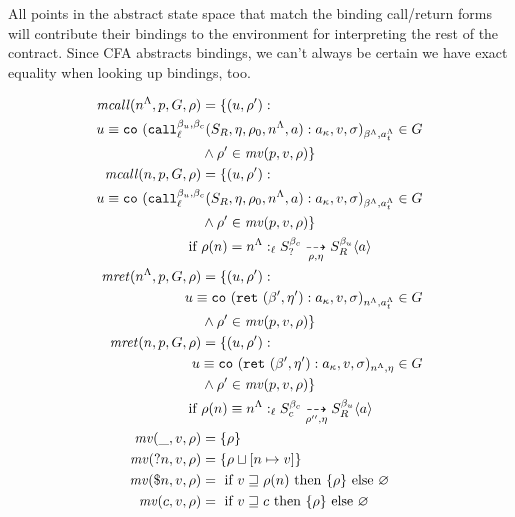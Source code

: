 \documentclass[preprint,onecolumn,9pt]{sigplanconf} %
\begin{document}
All points in the abstract state space that match the binding call/return forms will contribute their bindings to the environment for interpreting the rest of the contract.
%
Since CFA abstracts bindings, we can't always be certain we have exact equality when looking up bindings, too.

\begin{align*}
  \matchcall(\mtoplevelname, \mvpat, \mgraph, \menv) &=
    \setbuild{(\mnode, \menv')}
             {\\
              \mnode\equiv\co{\spush{\kmcall{\mmlab_u}{\mmlab_c}{\mlab}{\mscon_R, \mtimeline, \menv_0, \mtoplevelname, \maddr}}{\mkaddr}, \mval, \msto}{\msmlab}{\mstimeline} \in \mgraph\span\omit \\
                &\wedge \menv' \in \matchv(\mvpat, \mval, \menv)}
\\
  \matchcall(\mname, \mvpat, \mgraph, \menv) &=
    \setbuild{(\mnode, \menv')}
             {\\
              \mnode\equiv\co{\spush{\kmcall{\mmlab_u}{\mmlab_c}{\mlab}{\mscon_R, \mtimeline, \menv_0, \mtoplevelname, \maddr}}{\mkaddr}, \mval, \msto}{\msmlab}{\mstimeline} \in \mgraph\span\omit \\
                &\wedge \menv' \in \matchv(\mvpat, \mval, \menv)} \\
  \text{if } & \menv(\mname) = \blclos{\mtoplevelname}{\mmlab_u}{\mmlab_c}{\mlab}{\mscon_?}{\mscon_R}{\menv}{\mtimeline}{\maddr}
\\
  \matchret(\mtoplevelname, \mvpat, \mgraph, \menv) &=
    \setbuild{(\mnode, \menv')}
             {\\
              \mnode\equiv\co{\spush{\krt{\mmlab',\mtimeline'}}{\mkaddr}, \mval, \msto}{\mtoplevelname}{\mstimeline} \in \mgraph\span\omit \\
                &\wedge \menv' \in \matchv(\mvpat, \mval, \menv)}
\\
  \matchret(\mname, \mvpat, \mgraph, \menv) &=
    \setbuild{(\mnode, \menv')}
             {\\
              \mnode\equiv\co{\spush{\krt{\mmlab',\mtimeline'}}{\mkaddr}, \mval, \msto}{\mtoplevelname}{\mtimeline} \in \mgraph\span\omit \\
                &\wedge \menv' \in \matchv(\mvpat, \mval, \menv)} \\
  \text{if } & \menv(\mname) \equiv \blclos{\mtoplevelname}{\mmlab_u}{\mmlab_c}{\mlab}{\mscon_c}{\mscon_R}{\menv''}{\mtimeline}{\maddr}
\\
 \matchv(\swc, \mval, \menv) &= \setof{\menv}
\\
 \matchv(\sbind{\mname}, \mval, \menv) &= \setof{\ext{\menv}{\mname}{\mval}}
\\
 \matchv(\sref{\mname}, \mval, \menv) &= \text{ if } \mval \sqsupseteq \menv(\mname) \text{ then } \setof{\menv} \text{ else } \varnothing
\\
 \matchv(\mconstant, \mval, \menv) &= \text{ if } \mval \sqsupseteq \mconstant \text{ then } \setof{\menv} \text{ else } \varnothing
\end{align*}
\end{document}
